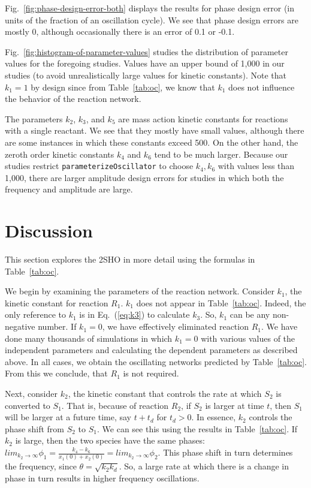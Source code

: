 \documentclass{bmcart}
\newcommand{\eqn}[1]{Eq.~(\ref{#1})}
\newcommand{\fig}[1]{Fig.~\ref{#1}}
\newcommand{\tab}[1]{Table~\ref{#1}}
\begin{document}
\fig{fig:phase-design-error-both} displays the results for phase design error (in units of the fraction of an oscillation cycle). We see that phase design errors are mostly 0, although occasionally there is an error of 0.1 or -0.1.

\fig{fig:histogram-of-parameter-values} studies the distribution of parameter values for the foregoing studies. Values have an upper bound of 1,000 in our studies (to avoid unrealistically large values for kinetic constants). Note that $k_1=1$ by design since from \tab{tab:oc}, we know that $k_1$ does not influence the behavior of the reaction network.

The parameters $k_2$, $k_3$, and $k_5$ are mass action kinetic constants for reactions with a single reactant. We see that they mostly have small values, although there are some instances in which these constants exceed 500. On the other hand, the zeroth order kinetic constants $k_4$ and $k_6$ tend to be much larger. Because our studies restrict {\tt parameterizeOscillator} to choose $k_4, k_6$ with values less than 1,000, there are larger amplitude design errors for studies in which both the frequency and amplitude are large.

\section*{Discussion}
This section explores the 2SHO in more detail using the formulas in \tab{tab:oc}.

We begin by examining the parameters of the reaction network. Consider $k_1$, the kinetic constant for reaction $R_1$. $k_1$ does not appear in \tab{tab:oc}. Indeed, the only reference to $k_1$ is in \eqn{eq:k3} to calculate $k_3$. So, $k_1$ can be any non-negative number. If $k_1= 0$, we have effectively eliminated reaction $R_1$. We have done many thousands of simulations in which $k_1 = 0$ with various values of the independent parameters and calculating the dependent parameters as described above. In all cases, we obtain the oscillating networks predicted by \tab{tab:oc}. From this we conclude, that $R_1$ is not required.

Next, consider $k_2$, the kinetic constant that controls the rate at which $S_2$ is converted to $S_1$. That is, because of reaction $R_2$, if $S_2$ is larger at time $t$, then $S_1$ will be larger at a future time, say $t + t_d$ for $t_d >0$. In essence, $k_2$ controls the phase shift from $S_2$ to $S_1$. We can see this using the results in \tab{tab:oc}. If $k_2$ is large, then the two species have the same phases:
$lim_{k_2 \rightarrow \infty} \phi_1 = \frac{k_4 -k_6}{x_1(0) + x_2(0)} = lim_{k_2 \rightarrow \infty} \phi_2$. This phase shift in turn determines the frequency, since $\theta = \sqrt{k_2 k_d}.$ So, a large rate at which there is a change in phase in turn results in higher frequency oscillations.
\end{document}
